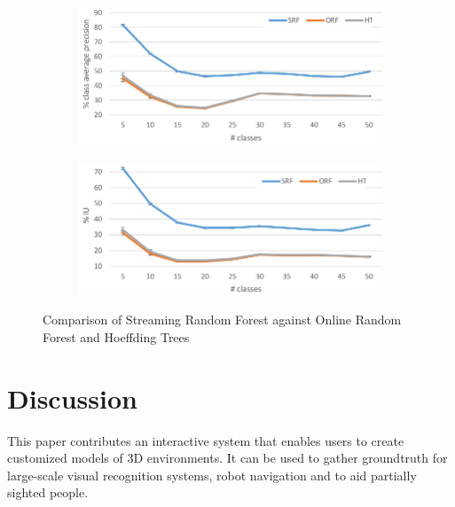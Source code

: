 \documentclass{llncs}
\begin{document}
  \begin{figure}
    \centering
    \begin{subfigure}{.5\textwidth}
      \centering
      \includegraphics[width=\linewidth]{figures/srf_ap}
      \label{fig:srf_ap}
    \end{subfigure}%
    \begin{subfigure}{.5\textwidth}
      \centering
      \includegraphics[width=\linewidth]{figures/srf_iu}
      \label{fig:srf_iu}
    \end{subfigure}
    \caption{Comparison of Streaming Random Forest against Online Random Forest and Hoeffding Trees}
    \label{fig:srf_results}
  \end{figure}

\section{Discussion}

  This paper contributes an interactive system that enables users to create customized models of 3D environments. It can be used to gather groundtruth for large-scale visual recognition systems, robot navigation and to aid partially sighted people.
  
\end{document}
